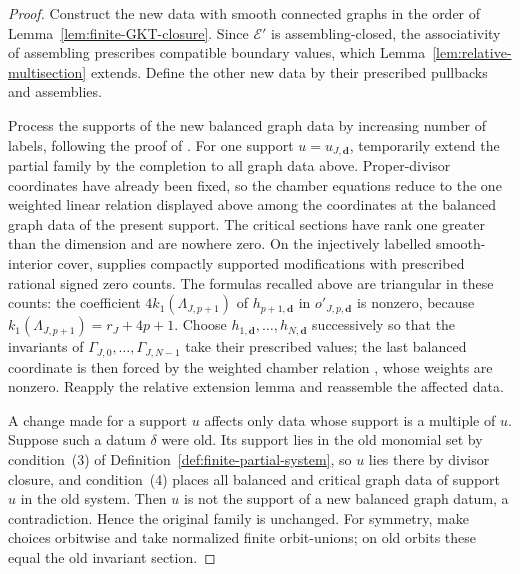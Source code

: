 \begin{proof}
Construct the new data with smooth connected graphs in the order of
Lemma~\ref{lem:finite-GKT-closure}.  Since $\mathcal E'$ is
assembling-closed, the associativity of assembling prescribes compatible
boundary values, which Lemma~\ref{lem:relative-multisection} extends.  Define the
other new data by their prescribed pullbacks and assemblies.

Process the supports of the new balanced graph data by increasing number of
labels, following the proof of \cite[Thm.~5.13]{grossetal2022open}.  For one
support $u=u_{J,\mathbf d}$, temporarily extend the partial family by the
completion to all graph data above.  Proper-divisor coordinates have already been fixed, so the
chamber equations reduce to the one weighted linear relation displayed above
among the coordinates at the balanced graph data of the present support.  The
critical sections have rank one greater than the dimension and are nowhere
zero.  On the injectively labelled smooth-interior cover,
\cite[Lem.~5.17]{grossetal2022open} supplies compactly supported
modifications with prescribed rational signed zero counts.  The formulas
\cite[(5.52)--(5.54)]{grossetal2022open} recalled above are triangular in
these counts: the coefficient $4k_1(\Lambda_{J,p+1})$ of $h_{p+1,\mathbf d}$
in $o'_{J,p,\mathbf d}$ is nonzero, because $k_1(\Lambda_{J,p+1})=r_J+4p+1$.
Choose $h_{1,\mathbf d},\dots,h_{N,\mathbf d}$ successively so that the
invariants of $\Gamma_{J,0},\dots,\Gamma_{J,N-1}$ take their prescribed
values; the last balanced coordinate is then forced by the weighted chamber
relation \cite[(5.50)]{grossetal2022open}, whose weights are nonzero.
Reapply the relative extension lemma and reassemble the affected data.

A change made for a support $u$ affects only data whose support is a multiple
of $u$.  Suppose such a datum $\delta$ were old.  Its support lies in the old
monomial set by condition~(3) of Definition~\ref{def:finite-partial-system},
so $u$ lies there by divisor closure, and condition~(4) places all balanced
and critical graph data of support $u$ in the old system.  Then $u$ is not the
support of a new balanced graph datum, a contradiction.  Hence the original
family is unchanged.  For symmetry, make choices orbitwise and take normalized
finite orbit-unions; on old orbits these equal the old invariant section.
\end{proof}

